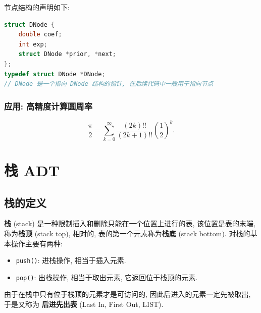 \documentclass[10pt,UTF8]{book} %
\begin{document}
节点结构的声明如下:
\begin{lstlisting}[language=C]
struct DNode {
    double coef;
    int exp;
    struct DNode *prior, *next;
};
typedef struct DNode *DNode;
// DNode 是一个指向 DNode 结构的指针, 在后续代码中一般用于指向节点
\end{lstlisting}

\subsubsection{应用: 高精度计算圆周率}

\[ \dfrac{\pi}{2} = \sum_{k=0}^\infty \dfrac{(2k)!!}{(2k+1)!!}\left(
    \dfrac{1}{2}
\right)^k. \]

\section{栈 ADT}

\subsection{栈的定义}

\textbf{栈} (stack) 是一种{\kaishu 限制插入和删除只能在一个位置上进行}的表,
该位置是表的末端, 称为\textbf{栈顶} (stack top), 相对的, 表的第一个元素称为\textbf{栈底} 
(stack bottom). 对栈的基本操作主要有两种:
\begin{itemize}[itemsep=0pt]
    \item \lstinline|push()|: 进栈操作, 相当于插入元素.
    \item \lstinline|pop()|: 出栈操作, 相当于取出元素, 它返回位于栈顶的元素.
\end{itemize}
由于在栈中只有位于栈顶的元素才是可访问的, 因此后进入的元素一定先被取出, 于是又称为
\textbf{后进先出表} (Last In, First Out, LIST).
\end{document}
